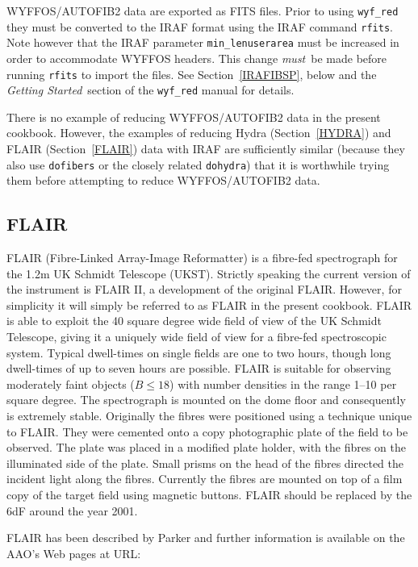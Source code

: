 \documentclass[twoside,11pt]{starlink}
\begin{document}
WYFFOS/AUTOFIB2 data are exported as FITS files.  Prior to using
\texttt{wyf\_red} they must be converted to the IRAF format using the
IRAF command \texttt{rfits}.  Note however that the IRAF parameter \texttt{min\_lenuserarea} must be increased in order to accommodate WYFFOS
headers.  This change \textit{must}\, be made before running \texttt{rfits}
to import the files.  See Section~\ref{IRAFIBSP}, below and the \textit{Getting Started}\, section of the  \texttt{wyf\_red} manual for details.

There is no example of reducing WYFFOS/AUTOFIB2 data in the present
cookbook.  However, the examples of reducing Hydra (Section~\ref{HYDRA})
and FLAIR (Section~\ref{FLAIR}) data with IRAF are sufficiently similar
(because they also use \texttt{dofibers} or the closely related \texttt{dohydra}) that it is worthwhile trying them before attempting to reduce
WYFFOS/AUTOFIB2 data.

\subsection{\label{FLAIR_I}FLAIR}

FLAIR (Fibre-Linked Array-Image Reformatter) is a fibre-fed spectrograph
for the 1.2m UK Schmidt Telescope (UKST).  Strictly speaking the current
version of the instrument is FLAIR II, a development of the original
FLAIR.  However, for simplicity it will simply be referred to as FLAIR
in the present cookbook.  FLAIR is able to exploit the 40 square degree
wide field of view of the UK Schmidt Telescope, giving it a uniquely wide
field of view for a fibre-fed spectroscopic system.  Typical dwell-times on
single fields are one to two hours, though long dwell-times of up to seven
hours are possible.  FLAIR is suitable for observing moderately faint
objects ($B \leq 18$) with number densities in the range 1--10 per square
degree.  The spectrograph is mounted on the dome floor and consequently is
extremely stable.  Originally the fibres were positioned using a
technique unique to FLAIR.  They were cemented onto a copy photographic
plate of the field to be observed.  The plate was placed in a modified
plate holder, with the fibres on the illuminated side of the plate.  Small
prisms on the head of the fibres directed the incident light along the
fibres.  Currently the fibres are mounted on top of a film copy of the
target field using magnetic buttons.  FLAIR should be replaced by the
6dF\cite{PARKER98} around the year 2001.

FLAIR has been described by Parker\cite{PARKER97A} and further information
is available on the AAO's Web pages at URL:
\end{document}
